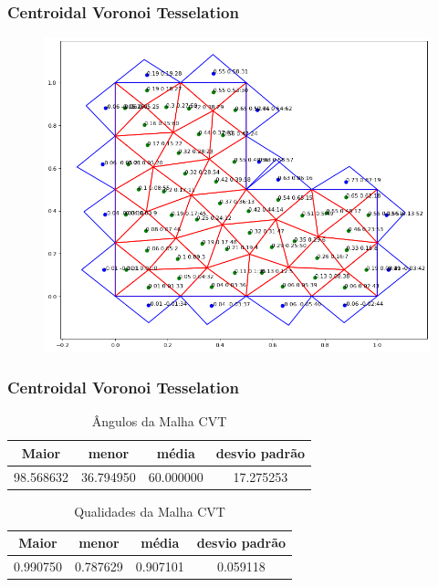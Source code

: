 \documentclass[brazil]{beamer}
\begin{document}
\begin{frame}
  \frametitle{Centroidal Voronoi Tesselation}

  \begin{figure}
    \includegraphics[width=0.6\linewidth]{fig/malha-cvt.png}
  \end{figure}

\end{frame}
\begin{frame}
  \frametitle{Centroidal Voronoi Tesselation}

  \begin{table}[hb]
    \centering
    \par\caption{Ângulos da Malha CVT}
    \begin{tabular}{c|c|c|c}
      Maior      & menor     & média     & desvio padrão \\\hline\hline
      98.568632&36.794950	&60.000000&17.275253\\\hline
    \end{tabular}
    \label{tab:angulos-malha-cvt}
  \end{table}

  \begin{table}[hb]
    \centering
    \par\caption{Qualidades da Malha CVT}
    \begin{tabular}{c|c|c|c}
      Maior    & menor    & média    & desvio padrão \\\hline\hline
      0.990750&0.787629&0.907101&0.059118\\\hline
    \end{tabular}
    \label{tab:qualidades-malha-cvt}
  \end{table}

\end{frame}
\end{document}
